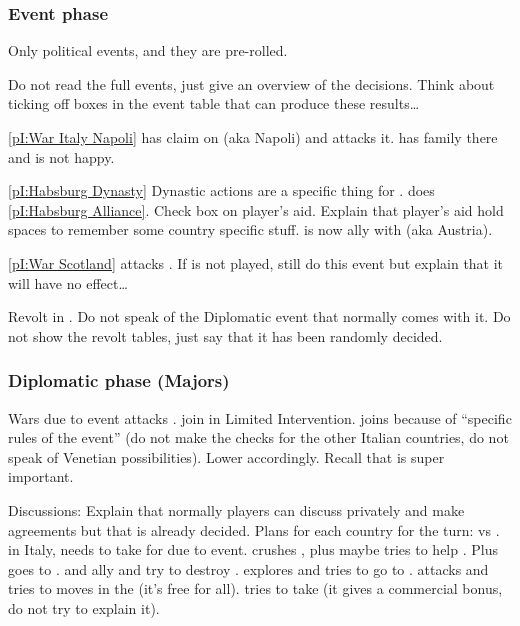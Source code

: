 \subsubsection{Event phase}
\aparag Only political events, and they are pre-rolled.

\aparag Do not read the full events, just give an overview of the decisions.
\bparag Think about ticking off boxes in the event table that can produce
these results\ldots

\aparag \ref{pI:War Italy Napoli}
\bparag \FRA has claim on  (aka Napoli) and attacks it. \HIS has
family there and is not happy.

\aparag \ref{pI:Habsburg Dynasty}
\bparag Dynastic actions are a specific thing for \HIS.
\bparag \HIS does \ref{pI:Habsburg Alliance}. Check box on player's
aid. Explain that player's aid hold spaces to remember some country specific
stuff.
\bparag \HIS is now ally with \paysHabsbourg (aka Austria).

\aparag \ref{pI:War Scotland}
\bparag \paysEcosse attacks \ANG.
\bparag If \ANG is not played, still do this event but explain that it will
have no effect\ldots

\aparag Revolt
\bparag \REVOLT\facemoins in \provinceCatalogne.
\bparag Do not speak of the Diplomatic event that normally comes with it. Do
not show the revolt tables, just say that it has been randomly decided.

\subsubsection{Diplomatic phase (Majors)}
\aparag Wars due to event
\bparag \FRA attacks \paysNaples. \HIS join in Limited
Intervention. \paysSavoie joins \FRA because of ``specific rules of the
event'' (do not make the checks for the other Italian countries, do not speak
of Venetian possibilities).
\bparag Lower \STAB accordingly. Recall that \STAB is super important.

\aparag Discussions: Explain that normally players can discuss privately and
make agreements but that is already decided. Plans for each country for the
turn:
\bparag \ANG vs \paysEcosse.
\bparag \FRA in Italy, needs to take \villeNaples for \VPs due to event.
\bparag \HIS crushes \REVOLT, plus maybe tries to help \paysNaples. Plus goes
to \continentAmerica.
\bparag \POL and \RUS ally and try to destroy \paysDon.
\bparag \POR explores and tries to go to \continentIndia.
\bparag \TUR attacks \paysGeorgie and tries to moves in the \regionBalkans
(it's free for all).
\bparag \VEN tries to take \villeRagusa (it gives a commercial bonus, do not
try to explain it).

